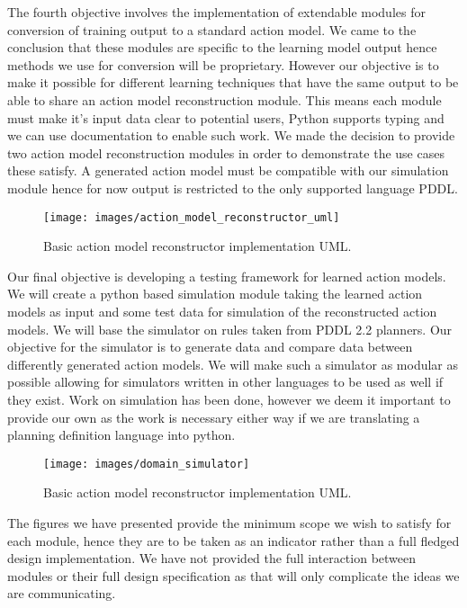 The fourth objective involves the implementation of extendable modules for conversion of training output to a standard action model. We came to the conclusion that these modules are specific to the learning model output hence methods we use for conversion will be proprietary. However our objective is to make it possible for different learning techniques that have the same output to be able to share an action model reconstruction module. This means each module must make it's input data clear to potential users, Python supports typing and we can use documentation to enable such work. We made the decision to provide two action model reconstruction modules in order to demonstrate the use cases these satisfy. A generated action model must be compatible with our simulation module hence for now output is restricted to the only supported language PDDL. 
\begin{figure}[h]
\centering
 \texttt{[image: images/action\_model\_reconstructor\_uml]}
 \caption{Basic action model reconstructor implementation UML.}
 \label{fig:action-model-reconstructor-uml}
\end{figure}
\newpage
Our final objective is developing a testing framework for learned action models. We will create a python based simulation module taking the learned action models as input and some test data for simulation of the reconstructed action models. We will base the simulator on rules taken from PDDL 2.2 planners. Our objective for the simulator is to generate data and compare data between differently generated action models. We will make such a simulator as modular as possible allowing for simulators written in other languages to be used as well if they exist. Work on simulation has been done, however we deem it important to provide our own as the work is necessary either way if we are translating a planning definition language into python. 
\begin{figure}[h]
\centering
 \texttt{[image: images/domain\_simulator]}
 \caption{Basic action model reconstructor implementation UML.}
 \label{fig:domain-simulator-uml}
\end{figure}

The figures we have presented provide the minimum scope we wish to satisfy for each module, hence they are to be taken as an indicator rather than a full fledged design implementation. We have not provided the full interaction between modules or their full design specification as that will only complicate the ideas we are communicating.





